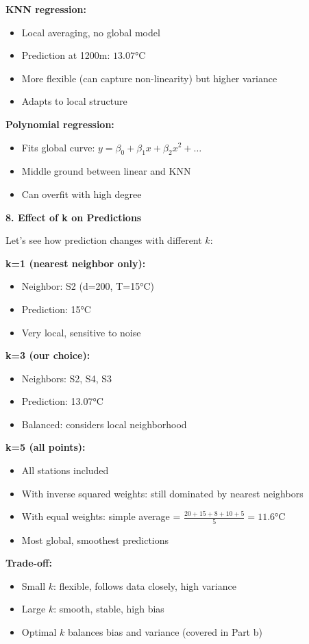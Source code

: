 \documentclass[12pt]{article}
\begin{document}
\begin{explanation}
\textbf{KNN regression:}
\begin{itemize}
    \item Local averaging, no global model
    \item Prediction at 1200m: \(13.07°\)C
    \item More flexible (can capture non-linearity) but higher variance
    \item Adapts to local structure
\end{itemize}

\textbf{Polynomial regression:}
\begin{itemize}
    \item Fits global curve: \(y = \beta_0 + \beta_1 x + \beta_2 x^2 + \ldots\)
    \item Middle ground between linear and KNN
    \item Can overfit with high degree
\end{itemize}

\textbf{8. Effect of k on Predictions}

Let's see how prediction changes with different \(k\):

\textbf{k=1 (nearest neighbor only):}
\begin{itemize}
    \item Neighbor: S2 (d=200, T=15°C)
    \item Prediction: 15°C
    \item Very local, sensitive to noise
\end{itemize}

\textbf{k=3 (our choice):}
\begin{itemize}
    \item Neighbors: S2, S4, S3
    \item Prediction: 13.07°C
    \item Balanced: considers local neighborhood
\end{itemize}

\textbf{k=5 (all points):}
\begin{itemize}
    \item All stations included
    \item With inverse squared weights: still dominated by nearest neighbors
    \item With equal weights: simple average = \(\frac{20+15+8+10+5}{5} = 11.6°\)C
    \item Most global, smoothest predictions
\end{itemize}

\textbf{Trade-off:}
\begin{itemize}
    \item Small \(k\): flexible, follows data closely, high variance
    \item Large \(k\): smooth, stable, high bias
    \item Optimal \(k\) balances bias and variance (covered in Part b)
\end{itemize}


\end{explanation}
\end{document}

